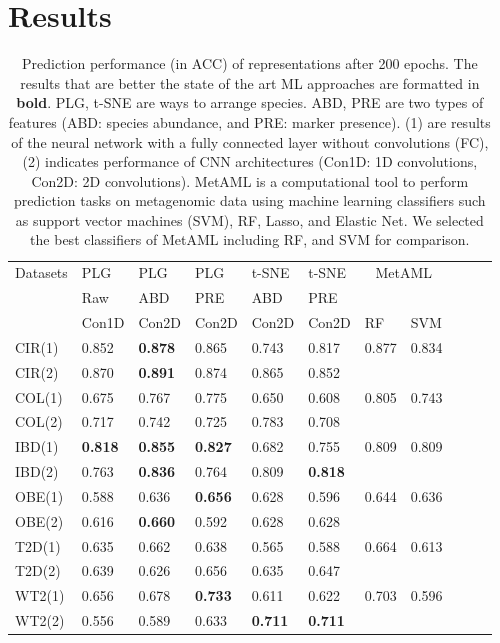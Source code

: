 \documentclass{article}
\begin{document}
\section{Results}
\begin{table}[t]
\caption{Prediction performance (in ACC) of representations after 200 epochs. The results that are better the state of the art ML approaches are formatted in \textbf{bold}. PLG, t-SNE are ways to arrange species. ABD, PRE are two types of features (ABD: species abundance, and PRE: marker presence). (1) are results of the neural network with a fully connected layer without convolutions (FC), (2) indicates performance of CNN architectures (Con1D: 1D convolutions, Con2D: 2D convolutions). MetAML \cite{ML_large_metagenomic_tool_insight2016} is a computational tool to perform prediction tasks on metagenomic data using machine learning classifiers such as support vector machines (SVM), RF, Lasso, and Elastic Net. We selected the best classifiers of MetAML including RF, and SVM for comparison. }
  \label{tab-res}
  \centering
  \begin{tabular}{lllllllllll}
    \toprule
     Datasets &  PLG & PLG & PLG  & t-SNE  & t-SNE &\multicolumn{2}{c}{MetAML} \\
       & Raw & ABD  & PRE &  ABD & PRE \\
     & Con1D & Con2D & Con2D  & Con2D & Con2D & RF & SVM  \\
    \midrule
    CIR(1) & 0.852  & \textbf{0.878} & 0.865  & 0.743 & 0.817         & 0.877 & 0.834 \\
    CIR(2)& 0.870  &   \textbf{0.891} & 0.874 & 0.865 &  0.852 \\
    COL(1)& 0.675 &  0.767 & 0.775 & 0.650 & 0.608       & 0.805& 0.743 \\
    COL(2)& 0.717  & 0.742 & 0.725 & 0.783 & 0.708  \\
    IBD(1)& \textbf{0.818}  &  \textbf{0.855} & \textbf{0.827}  & 0.682 & 0.755 & 0.809      & 0.809 \\
    IBD(2)&   0.763    & \textbf{0.836} & 0.764 & 0.809 & \textbf{0.818}  \\
    OBE(1)& 0.588  &  0.636 & \textbf{0.656}  & 0.628 & 0.596            & 0.644 & 0.636\\
    OBE(2)&  0.616     &  \textbf{0.660} & 0.592 & 0.628 & 0.628  \\
    T2D(1)& 0.635  &  0.662 & 0.638  & 0.565 & 0.588        & 0.664  & 0.613 \\
    T2D(2)&   0.639    & 0.626 & 0.656 & 0.635 & 0.647  \\
    WT2(1)& 0.656  &  0.678 & \textbf{0.733} &0.611 &  0.622 & 0.703 & 0.596\\
    WT2(2)&   0.556  &  0.589 & 0.633 & \textbf{0.711} & \textbf{0.711} \\
    \bottomrule
  \end{tabular}
\end{table}
\end{document}
